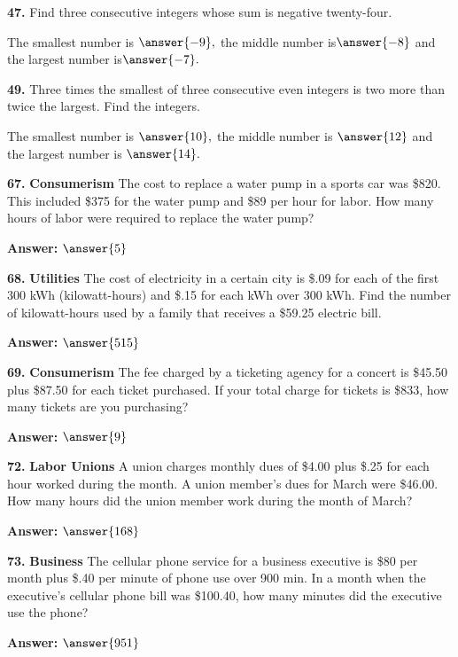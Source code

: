 \documentclass{ximera}
\begin{document}
\begin{problem}
\textbf{47.} Find three consecutive integers whose sum is negative twenty-four.

The smallest number is $\answer{-9},$ the middle number is$ \answer{-8}$ and the largest number is$ \answer{-7}.$
\end{problem}

\begin{problem}
\textbf{49.} Three times the smallest of three consecutive even integers is two more than
  twice the largest. Find the integers.

 

The smallest number is $\answer{10},$ the middle number is $\answer{12}$ and the largest number is $\answer{14}.$
\end{problem}

\begin{problem}
\textbf{67.} \textbf{Consumerism} The cost to replace a water pump in a sports car was \$820.
  This included \$375 for the water pump and \$89 per hour for labor. How many hours of
  labor were required to replace the water pump?

\textbf{Answer:} $\answer{5}$
\end{problem}

\begin{problem}
\textbf{68.} \textbf{Utilities} The cost of electricity in a certain city is \$.09 for each of
  the first 300 kWh (kilowatt-hours) and \$.15 for each kWh over 300 kWh. Find the number
  of kilowatt-hours used by a family that receives a \$59.25 electric bill.

\textbf{Answer:} $\answer{515}$
\end{problem}

\begin{problem}
\textbf{69.} \textbf{Consumerism} The fee charged by a ticketing agency for a concert is
  \$45.50 plus \$87.50 for each ticket purchased. If your total charge for tickets is
  \$833, how many tickets are you purchasing?

\textbf{Answer:} $\answer{9}$
\end{problem}

\begin{problem}
\textbf{72.} \textbf{Labor Unions} A union charges monthly dues of \$4.00 plus \$.25 for each
  hour worked during the month. A union member's dues for March were \$46.00. How many
  hours did the union member work during the month of March?

\textbf{Answer:} $\answer{168}$
\end{problem}

\begin{problem}
\textbf{73.} \textbf{Business} The cellular phone service for a business executive is \$80 per
  month plus \$.40 per minute of phone use over 900 min. In a month when the executive's
  cellular phone bill was \$100.40, how many minutes did the executive use the phone?

\textbf{Answer:} $\answer{951}$
\end{problem}
\end{document}
